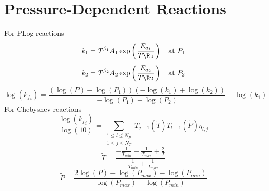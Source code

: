 \documentclass[a4paper,10pt]{article}
\begin{document}
\section{Pressure-Dependent Reactions}
For PLog reactions
\begin{dmath} k_{1}=T^{\beta_1} A_{1} \operatorname{exp}\left({\frac{E_{a_1}}{T \Ru}}\right)\text{\quad at $P_1$}\end{dmath} 
\begin{dmath} k_{2}=T^{\beta_2} A_{2} \operatorname{exp}\left({\frac{E_{a_2}}{T \Ru}}\right)\text{\quad at $P_2$}\end{dmath} 
\begin{dmath} \log{\left ({k_f}_{i} \right )} = \frac{\left(\log{\left (P \right )} - \log{\left (P_{1} \right )}\right) \left(- \log{\left (k_{1} \right )} + \log{\left (k_{2} \right )}\right)}{- \log{\left (P_{1} \right )} + \log{\left (P_{2} \right )}} + \log{\left (k_{1} \right )}\end{dmath} 
For Chebyshev reactions
\begin{dmath} \frac{\log{\left ({k_f}_{i} \right )}}{\log{\left (10 \right )}} = \sum_{\substack{1 \leq l \leq N_{P}\\1 \leq j \leq N_{T}}} T_{j - 1}\left(\tilde{T}\right) T_{l - 1}\left(\tilde{P}\right) \eta_{l,j}\end{dmath} 
\begin{dmath} \tilde{T} = \frac{- \frac{1}{T_{min}} - \frac{1}{T_{max}} + \frac{2}{T}}{- \frac{1}{T_{min}} + \frac{1}{T_{max}}}\end{dmath} 
\begin{dmath} \tilde{P} = \frac{2 \log{\left (P \right )} - \log{\left (P_{max} \right )} - \log{\left (P_{min} \right )}}{\log{\left (P_{max} \right )} - \log{\left (P_{min} \right )}}\end{dmath} 
\end{document}
